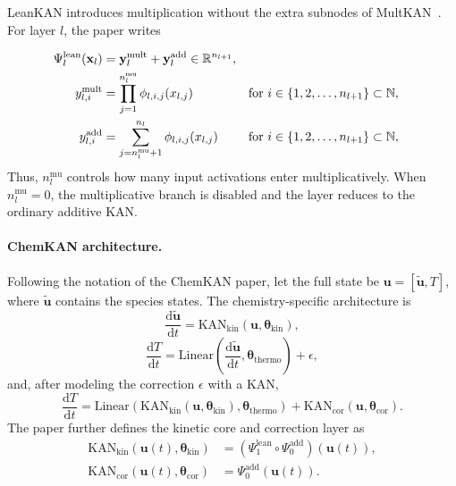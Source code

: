 \documentclass[11pt,a4paper]{article}
\newcommand{\dd}{\mathrm{d}}
\begin{document}
LeanKAN introduces multiplication without the extra subnodes of MultKAN~\cite{LeanKAN2025}. For layer $l$, the paper writes

\begin{align}
\Psi_l^{\mathrm{lean}}(\mathbf{x}_l)&=\mathbf{y}^{\mathrm{mult}}_l+\mathbf{y}^{\mathrm{add}}_l \in \mathbb{R}^{n_{l+1}},\\
y^{\mathrm{mult}}_{l,i}&=\prod_{j=1}^{n_l^{\mathrm{mu}}}\phi_{l,i,j}(x_{l,j}) && \text{for } i \in \set{1,2,\dots, n_{l+1}} \subset \mathbb{N}, \\
y^{\mathrm{add}}_{l,i}&=\sum_{j=n_l^{\mathrm{mu}}+1}^{n_l}\phi_{l,i,j}(x_{l,j}) && \text{for } i \in \set{1,2,\dots, n_{l+1}} \subset \mathbb{N},
\end{align}
Thus, $n_l^{\mathrm{mu}}$ controls how many input activations enter multiplicatively. When $n_l^{\mathrm{mu}}=0$, the multiplicative branch is
disabled and the layer reduces to the ordinary additive KAN.


\paragraph{ChemKAN architecture.}
Following the notation of the ChemKAN paper, let the full state be $\mathbf{u}=[\widetilde{\mathbf{u}},T]$, where $\widetilde{\mathbf{u}}$ contains the species states. The chemistry-specific architecture is~\cite{Koenig_2025}
\setcounter{equation}{12}
\begin{equation}
    \frac{\dd \widetilde{\mathbf{u}}}{\dd t}
    = \mathrm{KAN}_{\mathrm{kin}}\!\left(\mathbf{u},\boldsymbol{\theta}_{\mathrm{kin}}\right),
\end{equation}
\begin{equation}
    \frac{\dd T}{\dd t}
    = \mathrm{Linear}\!\left(\frac{\dd\widetilde{\mathbf{u}}}{\dd t},\boldsymbol{\theta}_{\mathrm{thermo}}\right)+\epsilon,
\end{equation}
and, after modeling the correction $\epsilon$ with a KAN,
\begin{equation}
    \frac{\dd T}{\dd t}
    = \mathrm{Linear}\!\left(
        \mathrm{KAN}_{\mathrm{kin}}(\mathbf{u},\boldsymbol{\theta}_{\mathrm{kin}}),
        \boldsymbol{\theta}_{\mathrm{thermo}}
      \right)
      + \mathrm{KAN}_{\mathrm{cor}}(\mathbf{u},\boldsymbol{\theta}_{\mathrm{cor}}).
\end{equation}
The paper further defines the kinetic core and correction layer as
\begin{align}
    \mathrm{KAN}_{\mathrm{kin}}(\mathbf{u}(t),\boldsymbol{\theta}_{\mathrm{kin}})
    &=\left(\Psi^{\mathrm{lean}}_{1}\circ\Psi^{\mathrm{add}}_{0}\right)(\mathbf{u}(t)),\\
    \mathrm{KAN}_{\mathrm{cor}}(\mathbf{u}(t),\boldsymbol{\theta}_{\mathrm{cor}})
    &=\Psi^{\mathrm{add}}_{0}(\mathbf{u}(t)).
\end{align}
\end{document}
